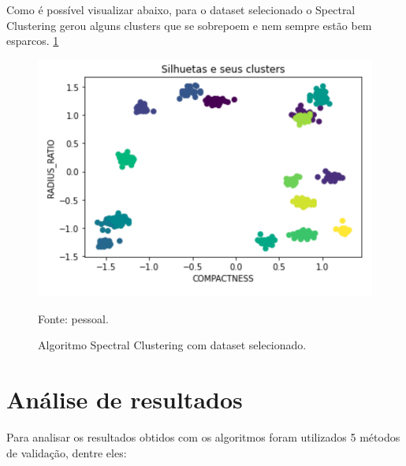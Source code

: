Como é possível visualizar abaixo, para o dataset selecionado o Spectral Clustering gerou alguns clusters que se sobrepoem e nem sempre estão bem esparcos. \ref{fig:spectralClusteringSelecionado}

\begin{figure}[h]
	\centering
	\includegraphics[width=0.7\linewidth]{images/spectralClusteringSelecionado}
	\caption{Algoritmo Spectral Clustering com dataset selecionado.}
	Fonte: pessoal.
	\label{fig:spectralClusteringSelecionado}
\end{figure}

\section{Análise de resultados}

Para analisar os resultados obtidos com os algoritmos foram utilizados 5 métodos de validação, dentre eles:

